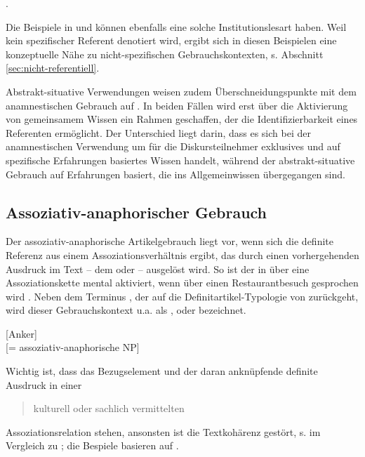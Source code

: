 \begin{exe}
	\ex \label{ex:post} .
\end{exe}

\noindent
Die Beispiele in  und  können ebenfalls eine solche Institutionslesart haben. Weil kein spezifischer Referent denotiert wird, ergibt sich in diesen Beispielen eine konzeptuelle Nähe zu nicht-spezifischen Gebrauchskontexten, s. Abschnitt \ref{sec:nicht-referentiell}.

Abstrakt-situative Verwendungen weisen zudem Überschneidungspunkte mit dem anamnestischen Gebrauch auf \parencite[62]{Himmelmann1997}. In beiden Fällen wird erst über die Aktivierung von gemeinsamem Wissen ein Rahmen geschaffen, der die Identifizierbarkeit eines Referenten ermöglicht. Der Unterschied liegt darin, dass es sich bei der anamnestischen Verwendung um für die Diskursteilnehmer exklusives und auf spezifische Erfahrungen basiertes Wissen handelt, während der abstrakt-situative Gebrauch auf Erfahrungen basiert, die ins Allgemeinwissen übergegangen sind. 

\subsection{Assoziativ-anaphorischer Gebrauch}\label{sec:asso}

Der assoziativ-anaphorische Artikelgebrauch liegt vor, wenn sich die definite Referenz aus einem Assoziationsverhältnis ergibt, das durch einen vorhergehenden Ausdruck im Text -- dem  \parencite[49]{Hawkins1978} oder  \parencite[6]{Cui2014} -- ausgelöst wird. So ist der  in  über eine Assoziationskette mental aktiviert, wenn über einen Restaurantbesuch gesprochen wird \parencite[Beispiel in Anlehnung an][50]{Schwarz2000}. Neben dem Terminus , der auf die Definitartikel-Typologie von \textcite{Hawkins1978} zurückgeht, wird dieser Gebrauchskontext u.a. als  \parencite{Clark1977},  \parencite{Prince1981} oder  \parencite{Schwarz2000} bezeichnet.  

\begin{exe}
	\ex \label{ex:asso}  [Anker] \\ [= assoziativ-anaphorische NP]  
\end{exe}
\noindent 
Wichtig ist, dass das Bezugselement und der daran anknüpfende definite Ausdruck in einer \blockcquote[36]{Himmelmann1997}{kulturell oder sachlich vermittelten} Assoziationsrelation stehen, ansonsten ist die Textkohärenz gestört, s.  im Vergleich zu ; die Bespiele basieren auf \textcite[123]{Hawkins1978}.

